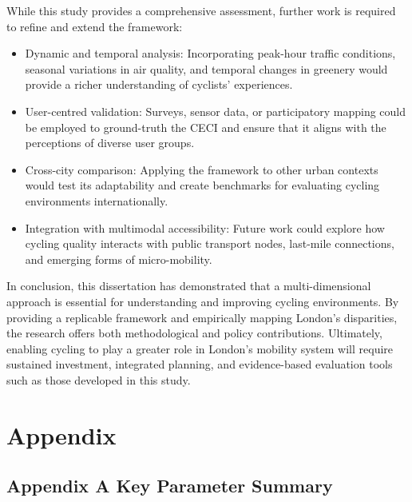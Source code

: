 \documentclass[
  12pt,
  oneside]{book}
\providecommand{\tightlist}{%
  \setlength{\itemsep}{0pt}\setlength{\parskip}{0pt}}
\begin{document}
While this study provides a comprehensive assessment, further work is required to refine and extend the framework:

\begin{itemize}
\tightlist
\item
  Dynamic and temporal analysis: Incorporating peak-hour traffic conditions, seasonal variations in air quality, and temporal changes in greenery would provide a richer understanding of cyclists' experiences.\\
\item
  User-centred validation: Surveys, sensor data, or participatory mapping could be employed to ground-truth the CECI and ensure that it aligns with the perceptions of diverse user groups.\\
\item
  Cross-city comparison: Applying the framework to other urban contexts would test its adaptability and create benchmarks for evaluating cycling environments internationally.\\
\item
  Integration with multimodal accessibility: Future work could explore how cycling quality interacts with public transport nodes, last-mile connections, and emerging forms of micro-mobility.
\end{itemize}

In conclusion, this dissertation has demonstrated that a multi-dimensional approach is essential for understanding and improving cycling environments. By providing a replicable framework and empirically mapping London's disparities, the research offers both methodological and policy contributions. Ultimately, enabling cycling to play a greater role in London's mobility system will require sustained investment, integrated planning, and evidence-based evaluation tools such as those developed in this study.

\printbibliography

\chapter*{Appendix}\label{appendix}

\section*{Appendix A Key Parameter Summary}\label{appendix-a-key-parameter-summary}
\end{document}
